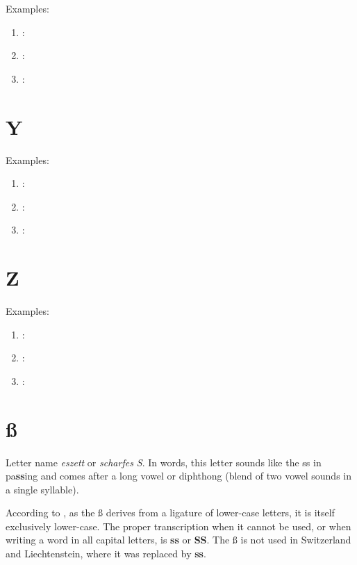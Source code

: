 Examples:
\begin{enumerate}
    \item \textbf{}: \textipa{[]}
    \item \textbf{}: \textipa{[]}
    \item \textbf{}: \textipa{[]}
\end{enumerate}

\section*{Y}

Examples:
\begin{enumerate}
    \item \textbf{}: \textipa{[]}
    \item \textbf{}: \textipa{[]}
    \item \textbf{}: \textipa{[]}
\end{enumerate}

\section*{Z}

Examples:
\begin{enumerate}
    \item \textbf{}: \textipa{[]}
    \item \textbf{}: \textipa{[]}
    \item \textbf{}: \textipa{[]}
\end{enumerate}

\section*{ß}

Letter name \textit{eszett} or \textit{scharfes S}. In words, this letter sounds like the ss in pa\textbf{ss}ing and comes after a long vowel or diphthong (blend of two vowel sounds in a single syllable).

According to \cite{wiki_germanalpha}, as the ß derives from a ligature of lower-case letters, it is itself exclusively lower-case. The proper transcription when it cannot be used, or when writing a word in all capital letters, is \textbf{ss} or \textbf{SS}. The ß is not used in Switzerland and Liechtenstein, where it was replaced by \textbf{ss}.

